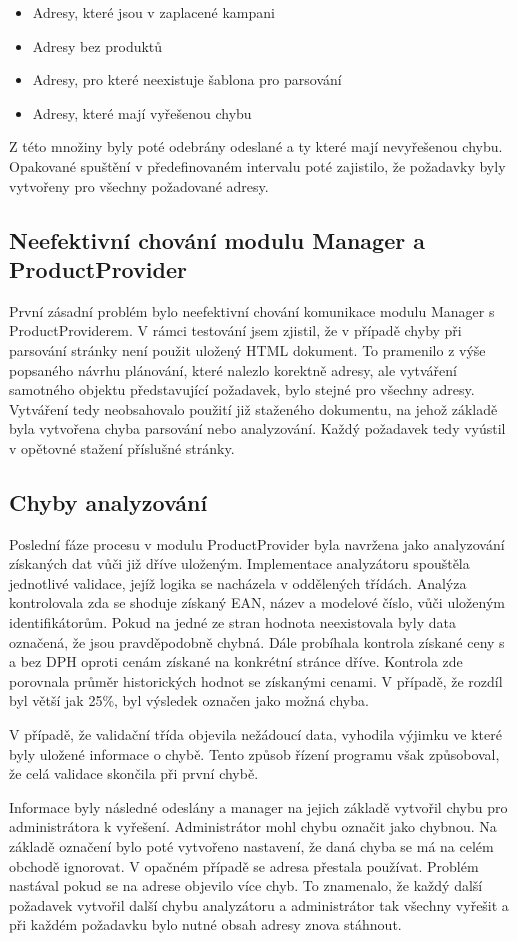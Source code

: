\documentclass[thesis=B,czech]{FITthesis}[2012/06/26]
\begin{document}
\begin{itemize}
\item Adresy, které jsou v zaplacené kampani
\item Adresy bez produktů
\item Adresy, pro které neexistuje šablona pro parsování
\item Adresy, které mají vyřešenou chybu
\end{itemize}

Z této množiny byly poté odebrány odeslané a ty které mají nevyřešenou chybu. Opakované spuštění v předefinovaném intervalu poté 
zajistilo, že požadavky byly vytvořeny pro všechny požadované adresy.

\subsection{Neefektivní chování modulu Manager a ProductProvider}
První zásadní problém bylo neefektivní chování komunikace modulu Manager s ProductProviderem. V rámci testování jsem zjistil, že v 
případě chyby při parsování stránky není použit uložený HTML dokument.
To pramenilo z výše popsaného návrhu plánování, které nalezlo korektně adresy, ale vytváření samotného objektu představující požadavek,
bylo stejné pro všechny adresy. Vytváření tedy neobsahovalo použití již staženého dokumentu, na jehož základě byla vytvořena 
chyba parsování nebo analyzování. Každý požadavek tedy vyústil v opětovné stažení příslušné stránky.

\subsection{Chyby analyzování}
Poslední fáze procesu v modulu ProductProvider byla navržena jako analyzování získaných dat vůči již dříve uloženým. Implementace analyzátoru 
spouštěla jednotlivé validace, jejíž logika se nacházela v oddělených třídách. 
Analýza kontrolovala zda se shoduje získaný EAN, název a modelové číslo, vůči uloženým identifikátorům. Pokud na jedné ze stran hodnota neexistovala
byly data označená, že jsou pravděpodobně chybná. Dále probíhala kontrola získané ceny s a bez DPH oproti cenám získané na konkrétní stránce dříve.
Kontrola zde porovnala průměr historických hodnot se získanými cenami. V případě, že rozdíl byl větší jak 25\%, byl výsledek označen jako
možná chyba.
\par
V případě, že validační třída objevila nežádoucí data,
vyhodila výjimku ve které byly uložené informace o chybě. Tento způsob řízení programu však způsoboval, že celá validace skončila při první chybě.
\par
Informace byly následné odeslány a manager na jejich základě vytvořil chybu pro administrátora k vyřešení. Administrátor mohl 
chybu označit jako chybnou. Na základě označení bylo poté vytvořeno nastavení, že daná chyba se má na celém obchodě ignorovat. V opačném případě se adresa přestala používat. Problém nastával pokud se na adrese objevilo více chyb. To znamenalo, že každý další požadavek vytvořil další
chybu analyzátoru a administrátor tak všechny vyřešit a při každém požadavku bylo nutné obsah adresy znova stáhnout.
\end{document}

